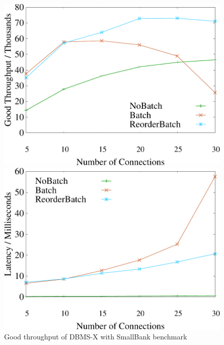 \begin{figure}[t]
	\centering
	\begin{minipage}[b]{0.31\linewidth}
		\centering
		\includegraphics[width=\textwidth]{./exp_fig/hekaton/hekaton_tps}
		\vspace{-2em}
		\caption{Good throughput of DBMS-X with SmallBank benchmark}
		\label{fig:hekaton:tps}
	\end{minipage}
\quad
	\begin{minipage}[b]{0.31\linewidth}
	\centering
	\includegraphics[width=\textwidth]{./exp_fig/hekaton/hekaton_latency}

\end{minipage}
\end{figure}
